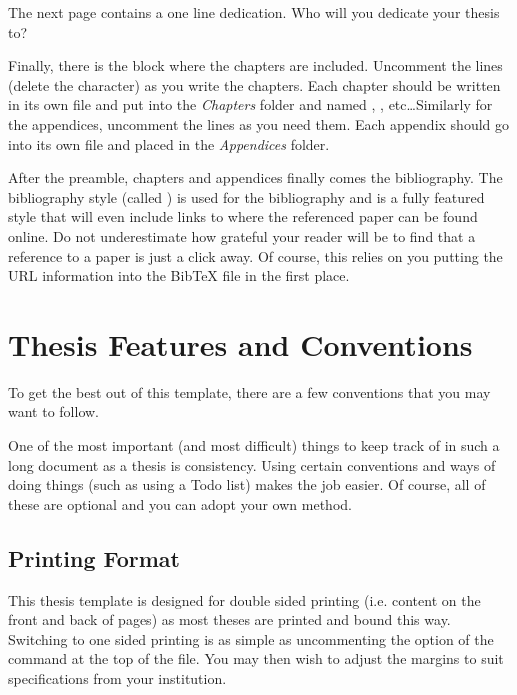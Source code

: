 The next page contains a one line dedication. Who will you dedicate your thesis to?

Finally, there is the block where the chapters are included. Uncomment the lines (delete the \code{\%} character) as you write the chapters. Each chapter should be written in its own file and put into the \emph{Chapters} folder and named , , etc\ldots Similarly for the appendices, uncomment the lines as you need them. Each appendix should go into its own file and placed in the \emph{Appendices} folder.

After the preamble, chapters and appendices finally comes the bibliography. The bibliography style (called ) is used for the bibliography and is a fully featured style that will even include links to where the referenced paper can be found online. Do not underestimate how grateful your reader will be to find that a reference to a paper is just a click away. Of course, this relies on you putting the URL information into the BibTeX file in the first place.


\section{Thesis Features and Conventions}\label{ThesisConventions}

To get the best out of this template, there are a few conventions that you may want to follow.

One of the most important (and most difficult) things to keep track of in such a long document as a thesis is consistency. Using certain conventions and ways of doing things (such as using a Todo list) makes the job easier. Of course, all of these are optional and you can adopt your own method.

\subsection{Printing Format}

This thesis template is designed for double sided printing (i.e. content on the front and back of pages) as most theses are printed and bound this way. Switching to one sided printing is as simple as uncommenting the  option of the  command at the top of the  file. You may then wish to adjust the margins to suit specifications from your institution.

